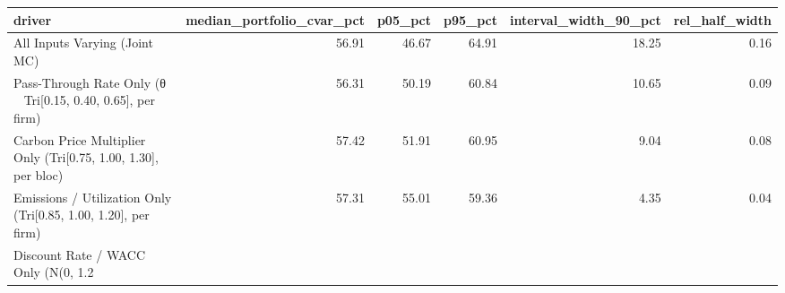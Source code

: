 \begin{tabular}{lrrrrr}
\toprule
driver & median_portfolio_cvar_pct & p05_pct & p95_pct & interval_width_90_pct & rel_half_width \\
\midrule
All Inputs Varying (Joint MC) & 56.91 & 46.67 & 64.91 & 18.25 & 0.16 \\
Pass-Through Rate Only (θ ~ Tri[0.15, 0.40, 0.65], per firm) & 56.31 & 50.19 & 60.84 & 10.65 & 0.09 \\
Carbon Price Multiplier Only (Tri[0.75, 1.00, 1.30], per bloc) & 57.42 & 51.91 & 60.95 & 9.04 & 0.08 \\
Emissions / Utilization Only (Tri[0.85, 1.00, 1.20], per firm) & 57.31 & 55.01 & 59.36 & 4.35 & 0.04 \\
Discount Rate / WACC Only (N(0, 1.2%
\bottomrule
\end{tabular}
